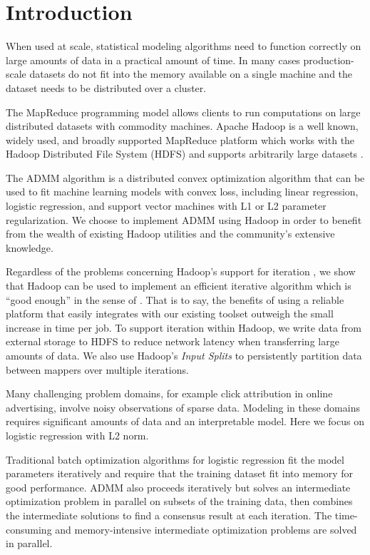\documentclass[10pt, conference, compsocconf]{IEEEtran}
\begin{document}
\section{Introduction}
When used at scale, statistical modeling algorithms need to function correctly on large amounts of data in a practical amount of time.  In many cases production-scale datasets do not fit into the memory available on a single machine and the dataset needs to be distributed over a cluster.

The MapReduce programming model \cite{dean2004} allows clients to run computations on large distributed datasets with commodity machines.  Apache Hadoop is a well known, widely used, and broadly supported MapReduce platform which works with the Hadoop Distributed File System (HDFS)  and supports arbitrarily large datasets \cite{white2009}.

The ADMM algorithm \cite{boyd} is a distributed convex optimization algorithm that can be used to fit machine learning models with convex loss, including linear regression, logistic regression, and support vector machines with L1 or L2 parameter regularization.  We choose to implement ADMM using Hadoop in order to benefit from the wealth of existing Hadoop utilities and the community's extensive knowledge.

Regardless of the problems concerning Hadoop's support for iteration \cite{bu2010}, we show that Hadoop can be used to implement an efficient iterative algorithm which is ``good enough'' in the sense of \cite{lin2012}.  That is to say, the benefits of using a reliable platform that easily integrates with our existing toolset outweigh the small increase in time per job.  To support iteration within Hadoop, we write data from external storage to HDFS to reduce network latency when transferring large amounts of data.  We also use Hadoop's \emph{Input Splits} to persistently partition data between mappers over multiple iterations. 

Many challenging problem domains, for example click attribution in online advertising, involve noisy observations of sparse data.  Modeling in these domains requires significant amounts of data and an interpretable model.  Here we focus on logistic regression with L2 norm.

Traditional batch optimization algorithms for logistic regression fit the model parameters iteratively and require that the training dataset fit into memory for good performance. ADMM also proceeds iteratively but solves an intermediate optimization problem in parallel on subsets of the training data, then combines the intermediate solutions to find a consensus result at each iteration. The time-consuming and memory-intensive intermediate optimization problems are solved in parallel.
\end{document}
